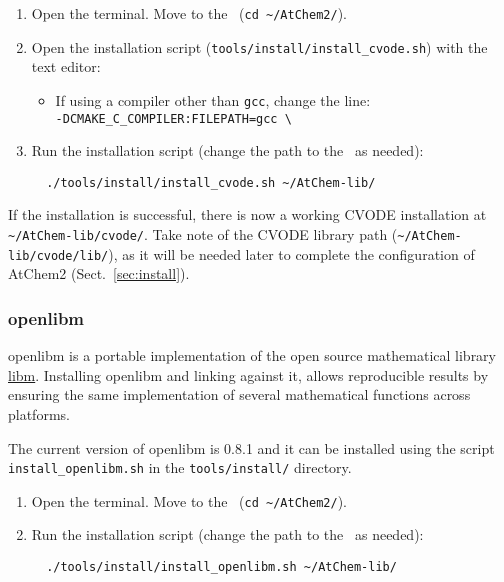 \begin{enumerate}
\item Open the terminal. Move to the \maindir\ (\verb|cd ~/AtChem2/|).
\item Open the installation script (\texttt{tools/install/install\_cvode.sh})
  with the text editor:
  \begin{itemize}
  \item If using a compiler other than \texttt{gcc}, change the line:\\
    \texttt{-DCMAKE\_C\_COMPILER:FILEPATH=gcc \textbackslash}
  \end{itemize}
\item Run the installation script (change the path to the \depdir\ as needed):
  \begin{verbatim}
  ./tools/install/install_cvode.sh ~/AtChem-lib/
  \end{verbatim}
\end{enumerate}

If the installation is successful, there is now a working CVODE installation
at \texttt{\textasciitilde/AtChem-lib/cvode/}. Take note of the CVODE library
path (\texttt{\textasciitilde/AtChem-lib/cvode/lib/}), as it will be
needed later to complete the configuration of AtChem2 (Sect.~\ref{sec:install}).

\subsubsection{openlibm}

openlibm is a portable implementation of the open source mathematical
library \href{https://openlibm.org}{libm}. Installing openlibm and
linking against it, allows reproducible results by ensuring the same
implementation of several mathematical functions across platforms.

The current version of openlibm is 0.8.1 and it can be installed using
the script \texttt{install\_openlibm.sh} in the \texttt{tools/install/}
directory.

\begin{enumerate}
\item Open the terminal. Move to the \maindir\ (\verb|cd ~/AtChem2/|).
\item Run the installation script (change the path to the \depdir\ as needed):
  \begin{verbatim}
  ./tools/install/install_openlibm.sh ~/AtChem-lib/
  \end{verbatim}
\end{enumerate}

